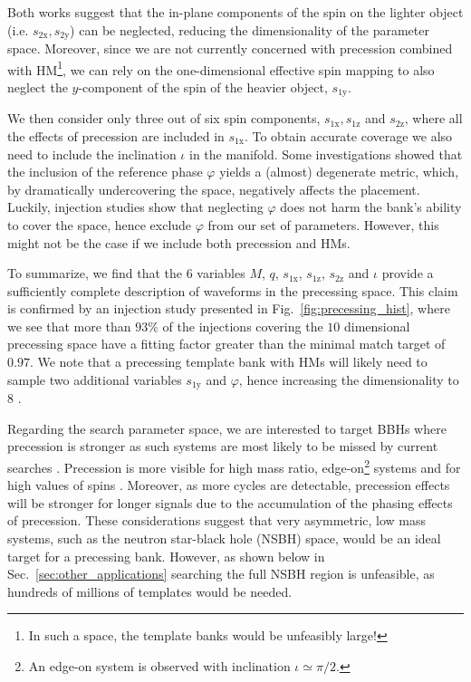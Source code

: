 \documentclass[twocolumn,showpacs,preprintnumbers,nofootinbib,prd,
superscriptaddress,10pt]{revtex4-2}
\begin{document}
Both works suggest that the in-plane components of the spin on the lighter object (i.e. $s_\text{2x}, s_\text{2y}$) can be neglected, reducing the dimensionality of the parameter space.
Moreover, since we are not currently concerned with precession combined with HM\footnote{In such a space, the template banks would be unfeasibly large!}, we can rely on the one-dimensional effective spin mapping \cite{Schmidt:2014iyl} to also neglect the $y$-component of the spin of the heavier object, $s_\text{1y}$.

We then consider only three out of six spin components, $s_\text{1x}, s_\text{1z}$ and $s_\text{2z}$, where all the effects of precession are included in $s_\text{1x}$. To obtain accurate coverage we also need to include the inclination $\iota$ in the manifold.
Some investigations showed that the inclusion of the reference phase $\varphi$ yields a (almost) degenerate metric, which, by dramatically undercovering the space, negatively affects the placement.
Luckily, injection studies show that neglecting $\varphi$ does not harm the bank's ability to cover the space, hence exclude $\varphi$ from our set of parameters. However, this might not be the case if we include both precession and HMs.

To summarize, we find that the $6$ variables $M$, $q$, $s_\text{1x}$, $s_\text{1z}$, $s_\text{2z}$ and $\iota$ provide a sufficiently complete description of waveforms in the precessing space.
This claim is confirmed by an injection study presented in Fig.~\ref{fig:precessing_hist}, where we see that more than $93\%$ of the injections covering the $10$ dimensional precessing space have a fitting factor greater than the minimal match target of $0.97$.
We note that a precessing template bank with HMs will likely need to sample two additional variables $s_\text{1y}$ and $\varphi$, hence increasing the dimensionality to $8$ \cite{Thomas:2020uqj}.

Regarding the search parameter space, we are interested to target BBHs where precession is stronger as such systems are most likely to be missed by current searches \cite{PhysRevD.102.041302, Fairhurst:2019vut}.
Precession is more visible for high mass ratio, edge-on\footnote{An edge-on system is observed with inclination $\iota\simeq \pi/2$.} systems and for high values of spins \cite{CalderonBustillo:2016rlt}. Moreover, as more cycles are detectable, precession effects will be stronger for longer signals due to the accumulation of the phasing effects of precession. These considerations suggest that very asymmetric, low mass systems, such as the neutron star-black hole (NSBH) space, would be an ideal target for a precessing bank. However, as shown below in Sec.~\ref{sec:other_applications} searching the full NSBH region is unfeasible, as hundreds of millions of templates would be needed.
\end{document}
